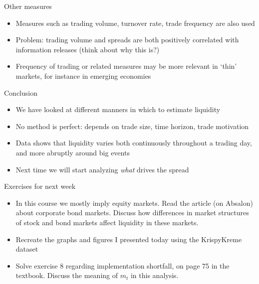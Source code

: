 \begin{frame}{Other measures}
\begin{itemize}
	\item Measures such as trading volume, turnover rate, trade frequency are also used
	\item Problem: trading volume and spreads are both positively correlated with information releases (think about why this is?)
	\item Frequency of trading or related measures may be more relevant in `thin' markets, for instance in emerging economies
\end{itemize}
\end{frame}


\begin{frame}{Conclusion}
	\begin{itemize}
		\item We have looked at different manners in which to estimate liquidity
		\item No method is perfect: depends on trade size, time horizon, trade motivation
		\item Data shows that liquidity varies both continuously throughout a trading day, and more abruptly around big events
		\item Next time we will start analyzing \textit{what} drives the spread
	\end{itemize}
\end{frame}


\begin{frame}{Exercises for next week}
	\begin{itemize}
		\item In this course we mostly imply equity markets. Read the article (on Absalon) about corporate bond markets. Discuss how differences in market structures of stock and bond markets affect liquidity in these markets.
		\item Recreate the graphs and figures I presented today using the KrispyKreme dataset
		\item Solve exercise 8 regarding implementation shortfall, on page 75 in the textbook.
		Discuss the meaning of $m_t$ in this analysis.
	\end{itemize}
\end{frame}


 